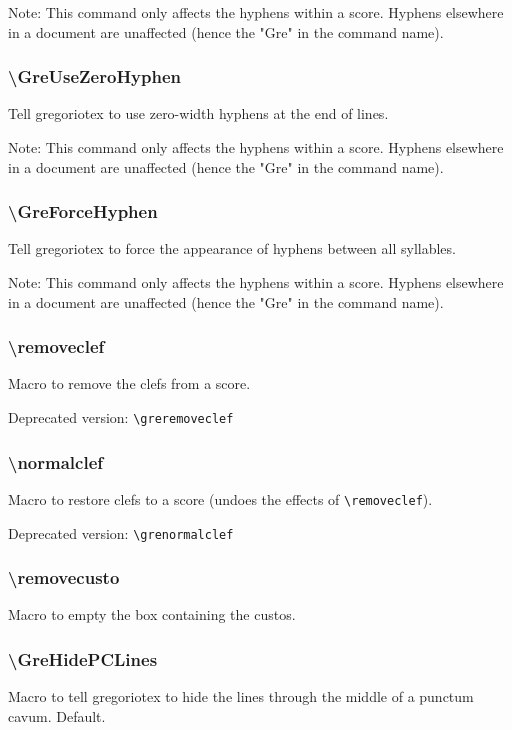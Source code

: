 Note: This command only affects the hyphens within a score.  Hyphens
elsewhere in a document are unaffected (hence the "Gre" in the command
name).

\subsubsection*{\textbackslash GreUseZeroHyphen}	
Tell gregoriotex to use zero-width hyphens at the end of lines.

Note: This command only affects the hyphens within a score.  Hyphens
elsewhere in a document are unaffected (hence the "Gre" in the command
name).

\subsubsection*{\textbackslash GreForceHyphen}
Tell gregoriotex to force the appearance of hyphens between all
syllables.

Note: This command only affects the hyphens within a score.  Hyphens
elsewhere in a document are unaffected (hence the "Gre" in the command
name).

\subsubsection*{\textbackslash removeclef}
Macro to remove the clefs from a score.

\smallskip\hskip 15pt Deprecated version: \verb=\greremoveclef=

\subsubsection*{\textbackslash normalclef}
Macro to restore clefs to a score (undoes the effects of
\verb=\removeclef=).

\smallskip\hskip 15pt Deprecated version: \verb=\grenormalclef=

\subsubsection*{\textbackslash removecusto}
Macro to empty the box containing the custos.

\subsubsection*{\textbackslash GreHidePCLines}
Macro to tell gregoriotex to hide the lines through the middle of a
punctum cavum.  Default.

